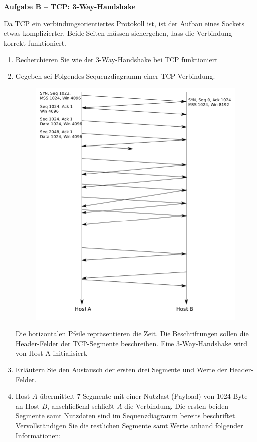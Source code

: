\documentclass[paper=a4,fontsize=11pt]{scrartcl}%
\numberwithin{equation}{section}
\begin{document}
\begin{center}\Large{\textbf{Aufgabe B -- TCP: 3-Way-Handshake}}\end{center}\vskip0.2in
Da TCP ein verbindungsorientiertes Protokoll ist, ist der Aufbau eines Sockets etwas komplizierter. Beide Seiten müssen sichergehen, dass die Verbindung korrekt funktioniert.
\begin{enumerate}
	\item Recherchieren Sie wie der 3-Way-Handshake bei TCP funktioniert \citep[S. 252f]{Kurose2012}
	\item Gegeben sei Folgendes Sequenzdiagramm einer TCP Verbindung.
	\begin{figure}[H]
		\centering
		\includegraphics[scale=0.3]{handshake}
	\end{figure}
	Die horizontalen Pfeile repräsentieren die Zeit. Die Beschriftungen sollen die Header-Felder der TCP-Segmente beschreiben. Eine 3-Way-Handshake wird von Host A initialisiert.
	\item Erläutern Sie den Austausch der ersten drei Segmente und Werte der Header-Felder.
	\item Host $A$ übermittelt 7 Segmente mit einer Nutzlast (Payload) von 1024 Byte an Host $B$, anschließend schließt $A$ die Verbindung. Die ersten beiden Segmente samt Nutzdaten sind im Sequenzdiagramm bereits beschriftet. Vervollständigen Sie die restlichen Segmente samt Werte anhand folgender Informationen:

\end{enumerate}
\end{document}
